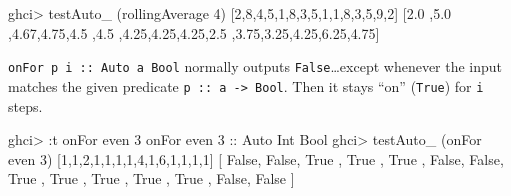 \documentclass[]{article}
\newenvironment{Shaded}{\begin{snugshade}}{\end{snugshade}}
\newcommand{\DataTypeTok}[1]{\textcolor[rgb]{0.13,0.29,0.53}{#1}}
\newcommand{\DecValTok}[1]{\textcolor[rgb]{0.00,0.00,0.81}{#1}}
\newcommand{\FloatTok}[1]{\textcolor[rgb]{0.00,0.00,0.81}{#1}}
\newcommand{\FunctionTok}[1]{\textcolor[rgb]{0.00,0.00,0.00}{#1}}
\newcommand{\NormalTok}[1]{#1}
\newcommand{\OtherTok}[1]{\textcolor[rgb]{0.56,0.35,0.01}{#1}}
\renewcommand{\href}[2]{#2\footnote{\url{#1}}}
\begin{document}
\begin{Shaded}
\begin{Highlighting}[]
\NormalTok{ghci}\FunctionTok{>}\NormalTok{ testAuto_ (rollingAverage }\DecValTok{4}\NormalTok{) [}\DecValTok{2}\NormalTok{,}\DecValTok{8}\NormalTok{,}\DecValTok{4}\NormalTok{,}\DecValTok{5}\NormalTok{,}\DecValTok{1}\NormalTok{,}\DecValTok{8}\NormalTok{,}\DecValTok{3}\NormalTok{,}\DecValTok{5}\NormalTok{,}\DecValTok{1}\NormalTok{,}\DecValTok{1}\NormalTok{,}\DecValTok{8}\NormalTok{,}\DecValTok{3}\NormalTok{,}\DecValTok{5}\NormalTok{,}\DecValTok{9}\NormalTok{,}\DecValTok{2}\NormalTok{]}
\NormalTok{[}\FloatTok{2.0}\NormalTok{ ,}\FloatTok{5.0}\NormalTok{ ,}\FloatTok{4.67}\NormalTok{,}\FloatTok{4.75}\NormalTok{,}\FloatTok{4.5}
\NormalTok{,}\FloatTok{4.5}\NormalTok{ ,}\FloatTok{4.25}\NormalTok{,}\FloatTok{4.25}\NormalTok{,}\FloatTok{4.25}\NormalTok{,}\FloatTok{2.5}
\NormalTok{,}\FloatTok{3.75}\NormalTok{,}\FloatTok{3.25}\NormalTok{,}\FloatTok{4.25}\NormalTok{,}\FloatTok{6.25}\NormalTok{,}\FloatTok{4.75}\NormalTok{]}
\end{Highlighting}
\end{Shaded}

\begin{description}
\tightlist
\item[\href{https://github.com/mstksg/inCode/tree/master/code-samples/machines/Auto.hs\#L125-146}{onFor}]
\texttt{onFor\ p\ i\ ::\ Auto\ a\ Bool} normally outputs
\texttt{False}\ldots{}except whenever the input matches the given predicate
\texttt{p\ ::\ a\ -\textgreater{}\ Bool}. Then it stays ``on'' (\texttt{True})
for \texttt{i} steps.
\end{description}

\begin{Shaded}
\begin{Highlighting}[]
\NormalTok{ghci}\FunctionTok{>} \FunctionTok{:}\NormalTok{t onFor even }\DecValTok{3}
\NormalTok{onFor even }\DecValTok{3}\OtherTok{ ::} \DataTypeTok{Auto} \DataTypeTok{Int} \DataTypeTok{Bool}
\NormalTok{ghci}\FunctionTok{>}\NormalTok{ testAuto_ (onFor even }\DecValTok{3}\NormalTok{) [}\DecValTok{1}\NormalTok{,}\DecValTok{1}\NormalTok{,}\DecValTok{2}\NormalTok{,}\DecValTok{1}\NormalTok{,}\DecValTok{1}\NormalTok{,}\DecValTok{1}\NormalTok{,}\DecValTok{1}\NormalTok{,}\DecValTok{4}\NormalTok{,}\DecValTok{1}\NormalTok{,}\DecValTok{6}\NormalTok{,}\DecValTok{1}\NormalTok{,}\DecValTok{1}\NormalTok{,}\DecValTok{1}\NormalTok{,}\DecValTok{1}\NormalTok{]}
\NormalTok{[ }\DataTypeTok{False}\NormalTok{, }\DataTypeTok{False}\NormalTok{, }\DataTypeTok{True}\NormalTok{ , }\DataTypeTok{True}\NormalTok{ , }\DataTypeTok{True}
\NormalTok{, }\DataTypeTok{False}\NormalTok{, }\DataTypeTok{False}\NormalTok{, }\DataTypeTok{True}\NormalTok{ , }\DataTypeTok{True}\NormalTok{ , }\DataTypeTok{True}
\NormalTok{, }\DataTypeTok{True}\NormalTok{ , }\DataTypeTok{True}\NormalTok{ , }\DataTypeTok{False}\NormalTok{, }\DataTypeTok{False}\NormalTok{ ]}
\end{Highlighting}
\end{Shaded}
\end{document}
